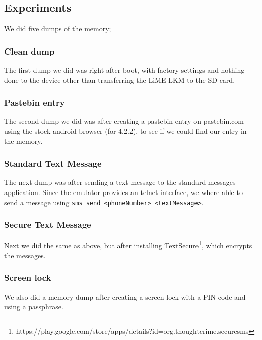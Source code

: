 \subsection{Experiments}
We did five dumps of the memory;
  \subsubsection{Clean dump}
  The first dump we did was right after boot, with factory settings and nothing done to the device 
  other than transferring the LiME LKM to the SD-card.
  \subsubsection{Pastebin entry}
  The second dump we did was after creating a pastebin entry on pastebin.com using the stock android browser (for 4.2.2),
  to see if we could find our entry in the memory.
  \subsubsection{Standard Text Message}
  The next dump was after sending a text message to the standard messages application. Since the emulator provides an telnet 
  interface, we where able to send a message using \texttt{sms send <phoneNumber> <textMessage>}.
  \subsubsection{Secure Text Message}
  Next we did the same as above, but after installing 
  TextSecure\footnote{https://play.google.com/store/apps/details?id=org.thoughtcrime.securesms}, which encrypts the messages. 
  \subsubsection{Screen lock}
  We also did a memory dump after creating a screen lock with a PIN code and using a passphrase.
